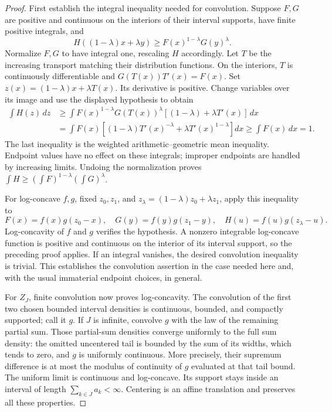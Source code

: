 \documentclass[11pt,a4paper]{article}
\numberwithin{equation}{section}
\theoremstyle{definition}
\theoremstyle{remark}
\begin{document}
\begin{proof}
First establish the integral inequality needed for convolution.
Suppose $F,G$ are positive and continuous on the interiors of their
interval supports, have finite positive integrals, and
\[
 H((1-\lambda)x+\lambda y)\ge F(x)^{1-\lambda}G(y)^\lambda.
\]
Normalize $F,G$ to have integral one, rescaling $H$ accordingly.
Let $T$ be the increasing transport matching their distribution
functions. On the interiors, $T$ is continuously differentiable
and $G(T(x))T'(x)=F(x)$. Set $z(x)=(1-\lambda)x+\lambda T(x)$.
Its derivative is positive. Change variables over its image and
use the displayed hypothesis to obtain
\begin{align*}
 \int H(z)\,dz
 &\ge\int F(x)^{1-\lambda}G(T(x))^\lambda
            [(1-\lambda)+\lambda T'(x)]\,dx\\
 &=\int F(x)\left[(1-\lambda)T'(x)^{-\lambda}
                   +\lambda T'(x)^{1-\lambda}\right]dx
 \ge\int F(x)\,dx=1.
\end{align*}
The last inequality is the weighted arithmetic--geometric mean
inequality. Endpoint values have no effect on these integrals;
improper endpoints are handled by increasing limits. Undoing the
normalization proves
$\int H\ge(\int F)^{1-\lambda}(\int G)^\lambda$.

For log-concave $f,g$, fixed $z_0,z_1$, and
$z_\lambda=(1-\lambda)z_0+\lambda z_1$, apply this inequality to
\[
 F(x)=f(x)g(z_0-x),\quad G(y)=f(y)g(z_1-y),\quad
 H(u)=f(u)g(z_\lambda-u).
\]
Log-concavity of $f$ and $g$ verifies the hypothesis. A nonzero
integrable log-concave function is positive and continuous on the
interior of its interval support, so the preceding proof applies.
If an integral vanishes, the desired convolution inequality is
trivial. This establishes the convolution assertion in the case
needed here and, with the usual immaterial endpoint choices, in
general.

For $Z_J$, finite convolution now proves log-concavity. The
convolution of the first two chosen bounded interval densities is
continuous, bounded, and compactly supported; call it $g$. If $J$
is infinite, convolve $g$ with the law of the remaining partial
sum. Those partial-sum densities converge uniformly to the full
sum density: the omitted uncentered tail is bounded by the sum
of its widths, which tends to zero, and $g$ is uniformly
continuous. More precisely, their supremum difference is at most
the modulus of continuity of $g$ evaluated at that tail bound.
The uniform limit is continuous and log-concave. Its support stays
inside an interval of length $\sum_{k\in J}a_k<\infty$.
Centering is an affine translation and preserves all these
properties.
\end{proof}
\end{document}
